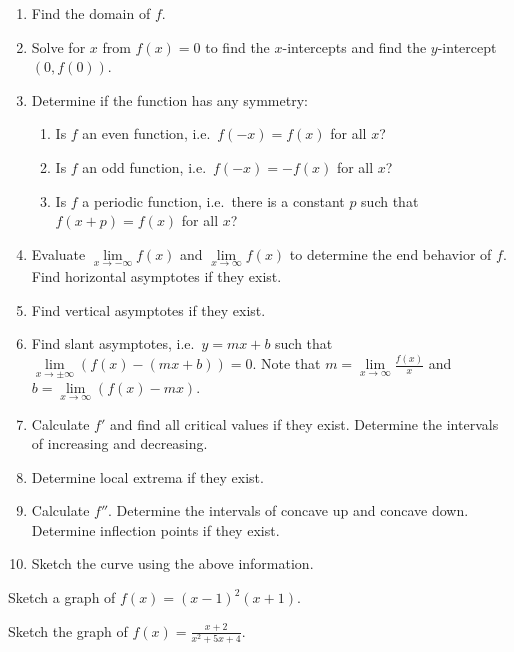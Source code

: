 \begin{enumerate}
\item
  Find the domain of \(f\).
\item
  Solve for \(x\) from \(f(x)=0\) to find the \(x\)-intercepts and find
  the \(y\)-intercept \((0, f(0))\).
\item
  Determine if the function has any symmetry:

  \begin{enumerate}
  \def\labelenumii{(\alph{enumii})}
  \item
    Is \(f\) an even function, i.e.~\(f(-x)=f(x)\) for all \(x\)?
  \item
    Is \(f\) an odd function, i.e.~\(f(-x)=-f(x)\) for all \(x\)?
  \item
    Is \(f\) a periodic function, i.e.~there is a constant \(p\) such
    that \(f(x+p)=f(x)\) for all \(x\)?
  \end{enumerate}
\item
  Evaluate \(\lim\limits_{x\to -\infty} f(x)\) and
  \(\lim\limits_{x\to \infty} f(x)\) to determine the end behavior of
  \(f\). Find horizontal asymptotes if they exist.
\item
  Find vertical asymptotes if they exist.
\item
  Find slant asymptotes, i.e.~\(y=mx+b\) such that
  \(\lim\limits_{x\to \pm\infty}(f(x)-(mx+b))=0\). Note that
  \(m=\lim\limits_{x\to \infty}\frac{f(x)}{x}\) and
  \(b=\lim\limits_{x\to \infty}(f(x)-mx)\).
\item
  Calculate \(f'\) and find all critical values if they exist. Determine
  the intervals of increasing and decreasing.
\item
  Determine local extrema if they exist.
\item
  Calculate \(f''\). Determine the intervals of concave up and concave
  down. Determine inflection points if they exist.
\item
  Sketch the curve using the above information.
\end{enumerate}

\begin{example}
  
Sketch a graph of \(f(x)=(x - 1)^2(x+1).\)

\end{example}
\vspace*{6\baselineskip}


\begin{example}
  
Sketch the graph of \(f(x)=\frac{x+2}{x^2+5x+4}\).

\end{example}
\vspace*{6\baselineskip}

